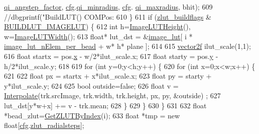 \begin{DoxyCode}
      \hyperlink{struct_q_trk_settings_aceebf67ba9ecc215d49c6b2739afae3d}{qi\_angstep\_factor}, \hyperlink{class_queued_tracker_afb847e7f49e0af6027d58af51d5914dc}{cfg}.\hyperlink{struct_q_trk_settings_a7b5f3e61b4dcab6330c56e7bcd96e82d}{qi\_minradius}, \hyperlink{class_queued_tracker_afb847e7f49e0af6027d58af51d5914dc}{cfg}.
      \hyperlink{struct_q_trk_computed_config_a9784dbeb638bde1f3204f9ca5af720c6}{qi\_maxradius}, bhit);
609             \textcolor{comment}{//dbgprintf("BuildLUT() COMPos: %
610         \}
611         \textcolor{keywordflow}{if} (\hyperlink{class_queued_c_p_u_tracker_a2f1c56ea335981c9a9ae0756b84931ce}{zlut\_buildflags} & \hyperlink{_queued_tracker_8h_ae264b7a73c89ed4c64ebd3cb6d2fb7f2}{BUILDLUT\_IMAGELUT}) \{
612             \textcolor{keywordtype}{int} h=\hyperlink{class_queued_c_p_u_tracker_a2cbe22c62e73f8c14bfe8fedf679a747}{ImageLUTHeight}(), w=\hyperlink{class_queued_c_p_u_tracker_a7c66d7294271781f726fc37a8778ac38}{ImageLUTWidth}();
613             \textcolor{keywordtype}{float}* lut\_dst = &\hyperlink{class_queued_c_p_u_tracker_af7ac0b5f68de59f97fa76a02c11763fe}{image\_lut}[ i * \hyperlink{class_queued_c_p_u_tracker_ac89ec6a24b361816350966d575e0b133}{image\_lut\_nElem\_per\_bead} + w*
      h* plane ];
614 
615             \hyperlink{structvector2}{vector2f} ilut\_scale(1,1);
616             \textcolor{keywordtype}{float} startx = pos.\hyperlink{structvector2_a22b63498d8e4abf9a2da054a247965b9}{x} - w/2*ilut\_scale.x;
617             \textcolor{keywordtype}{float} starty = pos.\hyperlink{structvector2_a00b3268bc895adddf0b72d6acd8274a7}{y} - h/2*ilut\_scale.y;
618 
619             \textcolor{keywordflow}{for} (\textcolor{keywordtype}{int} y=0;y<h;y++) \{
620                 \textcolor{keywordflow}{for} (\textcolor{keywordtype}{int} x=0;x<w;x++) \{
621 
622                     \textcolor{keywordtype}{float} px = startx + x*ilut\_scale.x;
623                     \textcolor{keywordtype}{float} py = starty + y*ilut\_scale.y;
624 
625                     \textcolor{keywordtype}{bool} outside=\textcolor{keyword}{false};
626                     \textcolor{keywordtype}{float} v = \hyperlink{utils_8h_aa9cfad3280334f04e799bb33b442f653}{Interpolate}(trk.srcImage, trk.width, trk.height, px, py, &outside)
      ;
627                     lut\_dst[y*w+x] += v - trk.mean;
628                 \}
629             \}
630         \}
631 
632         \textcolor{keywordtype}{float} *bead\_zlut=\hyperlink{class_queued_c_p_u_tracker_ab467243ae4103dbf2c0b87aa6ba72b3b}{GetZLUTByIndex}(i);
633         \textcolor{keywordtype}{float} *tmp = \textcolor{keyword}{new} \textcolor{keywordtype}{float}[\hyperlink{class_queued_tracker_afb847e7f49e0af6027d58af51d5914dc}{cfg}.\hyperlink{struct_q_trk_computed_config_ad1a121fa7d3152df6788ff285e4d2dc6}{zlut\_radialsteps}];
}
\end{DoxyCode}
